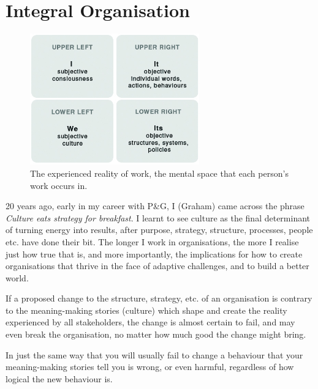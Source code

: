 \section{Integral Organisation}
\label{section:integral-organisation}
\begin{figure}
\includegraphics[width=0.65\textwidth]{./Images/laske-integral}
\caption[Experienced reality of work]{The experienced reality of work, the mental space that each person's work occurs in\cite{laske-vol2}.}
\label{fig:integral-organisation}
\end{figure}


20 years ago, early in my career with P\&G, I (Graham) came across the phrase \emph{Culture eats strategy for breakfast}. I learnt to see culture as the final determinant of turning energy into results, after purpose, strategy, structure, processes, people etc. have done their bit. The longer I work in organisations, the more I realise just how true that is, and more importantly, the implications for how to create organisations that thrive in the face of adaptive challenges, and to build a better world.


If a proposed change to the structure, strategy, etc. of an organisation is contrary to the meaning\hyp{}making stories (culture) which shape and create the reality experienced by all stakeholders, the change is almost certain to fail, and may even break the organisation, no matter how much good the change might bring.


In just the same way that you will usually fail to change a behaviour that your meaning\hyp{}making stories tell you is wrong, or even harmful, regardless of how logical the new behaviour is.



